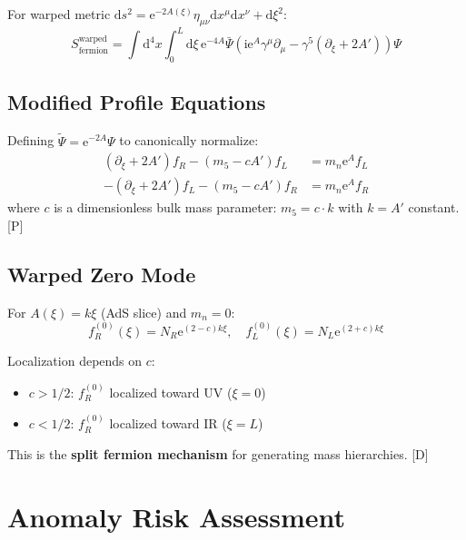 \documentclass[11pt,a4paper]{article}
\newcommand{\dd}{\mathrm{d}}
\newcommand{\ii}{\mathrm{i}}
\newcommand{\ee}{\mathrm{e}}
\begin{document}
For warped metric $\dd s^2 = \ee^{-2A(\xi)}\eta_{\mu\nu}\dd x^\mu \dd x^\nu + \dd\xi^2$:
\begin{equation}
S_{\text{fermion}}^{\text{warped}} = \int \dd^4x \int_0^L \dd\xi\, \ee^{-4A}
\bar{\Psi}\left(\ii \ee^A \gamma^\mu \partial_\mu - \gamma^5(\partial_\xi + 2A')\right)\Psi
\label{eq:warped-fermion-action}
\end{equation}

\subsection{Modified Profile Equations}

Defining $\tilde{\Psi} = \ee^{-2A}\Psi$ to canonically normalize:
\begin{equation}
\begin{aligned}
(\partial_\xi + 2A') f_R - (m_5 - cA') f_L &= m_n \ee^A f_L \\
-(\partial_\xi + 2A') f_L - (m_5 - cA') f_R &= m_n \ee^A f_R
\end{aligned}
\label{eq:warped-profile}
\end{equation}
where $c$ is a dimensionless bulk mass parameter: $m_5 = c \cdot k$ with $k = A'$ constant. [P]

\subsection{Warped Zero Mode}

For $A(\xi) = k\xi$ (AdS slice) and $m_n = 0$:
\begin{equation}
\boxed{
f_R^{(0)}(\xi) = N_R \ee^{(2-c)k\xi}, \quad f_L^{(0)}(\xi) = N_L \ee^{(2+c)k\xi}
}
\label{eq:warped-zero-mode}
\end{equation}

Localization depends on $c$:
\begin{itemize}
\item $c > 1/2$: $f_R^{(0)}$ localized toward UV ($\xi = 0$)
\item $c < 1/2$: $f_R^{(0)}$ localized toward IR ($\xi = L$)
\end{itemize}
This is the \textbf{split fermion mechanism} for generating mass hierarchies. [D]

\section{Anomaly Risk Assessment}
\label{sec:anomaly}
\end{document}
